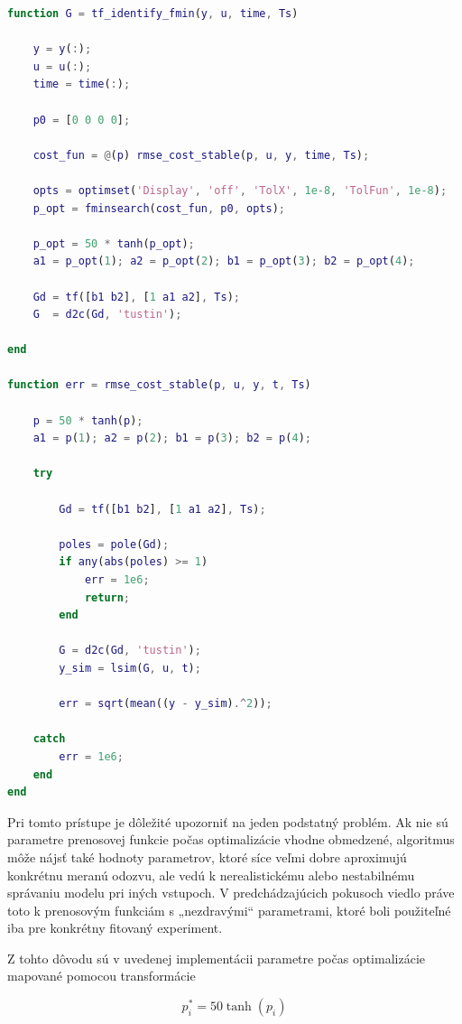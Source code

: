 \begin{lstlisting}[language=Matlab,
caption={MATLAB implementácia identifikácie pomocou optimalizácie prenosovej funkcie},
label={lst:tf_identify_fmin}]
function G = tf_identify_fmin(y, u, time, Ts)

    y = y(:);
    u = u(:);
    time = time(:);

    p0 = [0 0 0 0];

    cost_fun = @(p) rmse_cost_stable(p, u, y, time, Ts);

    opts = optimset('Display', 'off', 'TolX', 1e-8, 'TolFun', 1e-8);
    p_opt = fminsearch(cost_fun, p0, opts);

    p_opt = 50 * tanh(p_opt);
    a1 = p_opt(1); a2 = p_opt(2); b1 = p_opt(3); b2 = p_opt(4);

    Gd = tf([b1 b2], [1 a1 a2], Ts);
    G  = d2c(Gd, 'tustin');

end

function err = rmse_cost_stable(p, u, y, t, Ts)

    p = 50 * tanh(p);
    a1 = p(1); a2 = p(2); b1 = p(3); b2 = p(4);

    try

        Gd = tf([b1 b2], [1 a1 a2], Ts);

        poles = pole(Gd);
        if any(abs(poles) >= 1)
            err = 1e6;
            return;
        end

        G = d2c(Gd, 'tustin');
        y_sim = lsim(G, u, t);

        err = sqrt(mean((y - y_sim).^2));

    catch
        err = 1e6;
    end
end

\end{lstlisting}

Pri tomto prístupe je dôležité upozorniť na jeden podstatný problém.  
Ak nie sú parametre prenosovej funkcie počas optimalizácie vhodne obmedzené,  
algoritmus môže nájsť také hodnoty parametrov, ktoré síce veľmi dobre aproximujú konkrétnu meranú odozvu,  
ale vedú k nerealistickému alebo nestabilnému správaniu modelu pri iných vstupoch.  
V predchádzajúcich pokusoch viedlo práve toto k prenosovým funkciám s „nezdravými“ parametrami,  
ktoré boli použiteľné iba pre konkrétny fitovaný experiment.

Z tohto dôvodu sú v uvedenej implementácii parametre počas optimalizácie mapované pomocou transformácie

\begin{equation}
	p_i^\ast = 50 \tanh(p_i)
	\label{eq:param_transform_extended}
\end{equation}

